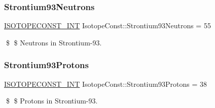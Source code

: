 \subsubsection{\texorpdfstring{Strontium93\+Neutrons}{Strontium93Neutrons}}
{\footnotesize\ttfamily \mbox{\hyperlink{group___isotope_const-_macros_ga5f18360b3e99483a35c32d789e62621c}{I\+S\+O\+T\+O\+P\+E\+C\+O\+N\+S\+T\+\_\+\+I\+NT}} Isotope\+Const\+::\+Strontium93\+Neutrons = 55}

\$ \$ Neutrons in Strontium-\/93. \mbox{\label{group___isotope_const-_strontium-_sr93_gab2ed931d617eac833ddd0a54a358b7d2}} 
\subsubsection{\texorpdfstring{Strontium93\+Protons}{Strontium93Protons}}
{\footnotesize\ttfamily \mbox{\hyperlink{group___isotope_const-_macros_ga5f18360b3e99483a35c32d789e62621c}{I\+S\+O\+T\+O\+P\+E\+C\+O\+N\+S\+T\+\_\+\+I\+NT}} Isotope\+Const\+::\+Strontium93\+Protons = 38}

\$ \$ Protons in Strontium-\/93. 